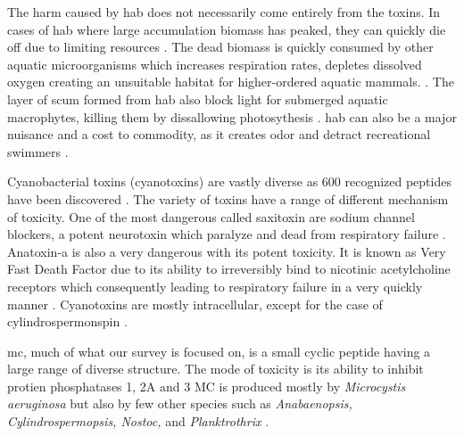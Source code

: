 The harm caused by \gls{hab} does not necessarily come entirely from the toxins. In cases of \gls{hab} where large accumulation biomass has peaked, they can quickly die off due to limiting resources \cite{charlton_oxygen_1980}. The dead biomass is quickly consumed by other aquatic microorganisms which increases respiration rates, depletes dissolved oxygen creating an unsuitable habitat for higher-ordered aquatic mammals.  \cite{anderson_harmful_2002}.
The layer of scum formed from \gls{hab} also block light for submerged aquatic macrophytes, killing them by dissallowing photosythesis \cite{ bucak_modeling_2018}. \gls{hab} can also be a major nuisance and a cost to commodity, as it creates odor and detract recreational swimmers  \cite{graham_cyanotoxin_2010, carmichael_health_2016}.




Cyanobacterial toxins (cyanotoxins) are vastly diverse as 600 recognized peptides have been discovered \cite{welker_cyanobacterial_2006}. The variety of toxins have a range of different mechanism of toxicity. One of the most dangerous called saxitoxin are sodium channel blockers, a potent neurotoxin which paralyze and dead from respiratory failure \cite{moore_richard_cyanobacterial_1993}.
Anatoxin-a is also a very dangerous with its potent toxicity. It is known as Very Fast Death Factor due to its ability to irreversibly bind to nicotinic acetylcholine receptors which consequently leading to respiratory failure in a very quickly manner \cite{codd_cyanobacterial_1999, moore_richard_cyanobacterial_1993}. Cyanotoxins are mostly intracellular, except for the case of cylindrospermonspin \cite{rastogi_cyanotoxin-microcystins:_2014}.



\gls{mc}, much of what our survey is focused on, is a small cyclic peptide having a large range of diverse structure. The mode of toxicity is its ability to inhibit protien phosphatases 1, 2A and 3 \cite{moore_richard_cyanobacterial_1993} MC is produced mostly by \emph{Microcystis aeruginosa} but also by few other species such as \emph{Anabaenopsis, Cylindrospermopsis, Nostoc,} and \emph{Planktrothrix} \cite{rastogi_cyanotoxin-microcystins:_2014, davis_phylogenies_2014}.

